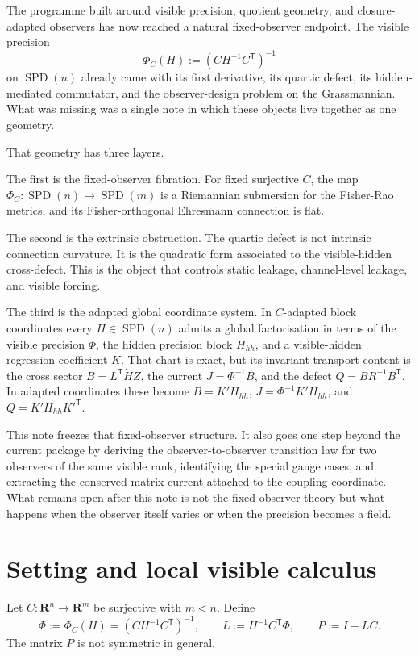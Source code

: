 \documentclass[11pt,a4paper]{article}
\numberwithin{equation}{section}
\DeclareMathOperator{\SPD}{SPD}
\newcommand{\R}{\mathbf R}
\theoremstyle{thmcompact}
\theoremstyle{remark}
\begin{document}
The programme built around visible precision, quotient geometry, and closure-adapted observers has now reached a natural fixed-observer endpoint. The visible precision
\begin{equation}
\Phi_C(H):=(CH^{-1}C^{\mathsf T})^{-1}
\label{eq:phi-def}
\end{equation}
on $\SPD(n)$ already came with its first derivative, its quartic defect, its hidden-mediated commutator, and the observer-design problem on the Grassmannian. What was missing was a single note in which these objects live together as one geometry.

That geometry has three layers.

The first is the fixed-observer fibration. For fixed surjective $C$, the map $\Phi_C:\SPD(n)\to\SPD(m)$ is a Riemannian submersion for the Fisher-Rao metrics, and its Fisher-orthogonal Ehresmann connection is flat.

The second is the extrinsic obstruction. The quartic defect is not intrinsic connection curvature. It is the quadratic form associated to the visible-hidden cross-defect. This is the object that controls static leakage, channel-level leakage, and visible forcing.

The third is the adapted global coordinate system. In $C$-adapted block coordinates every $H\in\SPD(n)$ admits a global factorisation in terms of the visible precision $\Phi$, the hidden precision block $H_{hh}$, and a visible-hidden regression coefficient $K$. That chart is exact, but its invariant transport content is the cross sector $B=L^{\mathsf T}\dot H Z$, the current $J=\Phi^{-1}B$, and the defect $Q=BR^{-1}B^{\mathsf T}$. In adapted coordinates these become $B=K'H_{hh}$, $J=\Phi^{-1}K'H_{hh}$, and $Q=K'H_{hh}K'^{\mathsf T}$.

This note freezes that fixed-observer structure. It also goes one step beyond the current package by deriving the observer-to-observer transition law for two observers of the same visible rank, identifying the special gauge cases, and extracting the conserved matrix current attached to the coupling coordinate. What remains open after this note is not the fixed-observer theory but what happens when the observer itself varies or when the precision becomes a field.

\section{Setting and local visible calculus}

Let $C:\R^n\to\R^m$ be surjective with $m<n$. Define
\begin{equation}
\Phi:=\Phi_C(H)=(CH^{-1}C^{\mathsf T})^{-1},
\qquad
L:=H^{-1}C^{\mathsf T}\Phi,
\qquad
P:=I-LC.
\label{eq:phi-L-P}
\end{equation}
The matrix $P$ is not symmetric in general.
\end{document}
